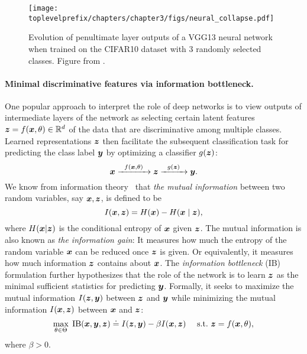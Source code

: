 \documentclass[../../book-main.tex]{subfiles}
\begin{document}
\begin{figure}
	\centering
	\texttt{[image: \\toplevelprefix/chapters/chapter3/figs/neural\_collapse.pdf]}
	\caption{Evolution of penultimate layer outputs of a VGG13 neural network when trained on the CIFAR10 dataset with 3 randomly selected classes. Figure from \cite{papyan2020prevalence}.}
	\label{chap4-fig:neural-collapse}
\end{figure}

\paragraph{Minimal discriminative features via information bottleneck.}
One popular approach to interpret the role of deep networks is to view outputs of intermediate layers of the network as selecting certain latent features $\bm{z} = f(\bm{x}, \theta) \in \mathbb{R}^d$ of the data that are discriminative among multiple classes. Learned representations $\bm{z}$ then  facilitate the subsequent classification task for predicting the class label $\bm{y}$ by optimizing a classifier $g(\bm{z})$:
\begin{equation}
	\bm{x}   \xrightarrow{\hspace{2mm} f(\bm{x}, \theta)\hspace{2mm}} \bm{z}  \xrightarrow{\hspace{2mm} g(\bm{z}) \hspace{2mm}} \bm{y}.
\end{equation}
We know from information theory~\cite{Cover-Thomas} that {\em the mutual information} between two random variables, say $\bm{x},\bm{z}$, is defined to be
\begin{equation}
	I(\bm{x}, \bm{z}) = H(\bm{x}) - H(\bm{x}\mid \bm{z}),
\end{equation}
where $H(\bm{x} \vert \bm{z})$ is the conditional entropy of $\bm{x}$ given $\bm{z}$. The mutual information is also known as {\em the information gain}: It measures how much the entropy of the random variable $\bm{x}$ can be reduced once $\bm{z}$ is given. Or equivalently, it measures how much information $\bm{z}$ contains about $\bm{x}$.  The {\em information bottleneck} (IB) formulation \cite{Tishby-ITW2015} further hypothesizes that the role of the network is to learn $\bm{z}$ as the minimal sufficient statistics for predicting $\bm{y}$. Formally, it seeks to maximize the mutual information $I(\bm{z}, \bm{y})$
between $\bm{z}$ and $\bm{y}$ while minimizing the mutual information $I(\bm{x}, \bm{z})$ between $\bm{x}$ and $\bm{z}$:
\begin{equation}
	\max_{\theta\in \Theta}\; \mbox{IB}(\bm{x}, \bm{y}, \bm{z}) \doteq I(\bm{z}, \bm{y}) - \beta I(\bm{x}, \bm{z}) \quad\ \mathrm{s.t.}\ \bm{z} = f(\bm{x}, \theta),
	\label{chap4-eqn:information-bottleneck}
\end{equation}
where $\beta >0$. 
\end{document}
